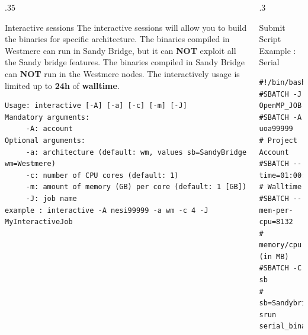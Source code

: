 \documentclass[final,t]{beamer}
\begin{document}
\begin{frame}[fragile]{}
\begin{columns}[t]
\begin{column}{.35\linewidth}
      \begin{block}{Interactive sessions}
      The interactive sessions will allow you to build the binaries for specific architecture. The binaries compiled in Westmere can run in Sandy Bridge, but it can \textbf{NOT} exploit all the Sandy bridge features. The binaries compiled in Sandy Bridge can \textbf{NOT} run in the Westmere nodes. The interactively usage is limited up to \textbf{24h} of \textbf{walltime}.
	 \begin{verbatim}
Usage: interactive [-A] [-a] [-c] [-m] [-J]
Mandatory arguments:
	 -A: account
Optional arguments:
	 -a: architecture (default: wm, values sb=SandyBridge wm=Westmere)
	 -c: number of CPU cores (default: 1)
	 -m: amount of memory (GB) per core (default: 1 [GB])
	 -J: job name
example : interactive -A nesi99999 -a wm -c 4 -J MyInteractiveJob
	\end{verbatim} 
      \end{block}


    \end{column}

    
    \begin{column}{.3\linewidth}
    

      \begin{block}{Submit Script Example : Serial}
              \vspace*{-3ex}
        \begin{verbatim}
#!/bin/bash
#SBATCH -J OpenMP_JOB
#SBATCH -A uoa99999         # Project Account
#SBATCH --time=01:00:00     # Walltime
#SBATCH --mem-per-cpu=8132  # memory/cpu (in MB)
#SBATCH -C sb               # sb=Sandybridge,wm=Westmere
srun serial_binary
        \end{verbatim}
                \vspace*{-4ex}
      \end{block}


\end{column}
\end{columns}
\end{frame}
\end{document}
